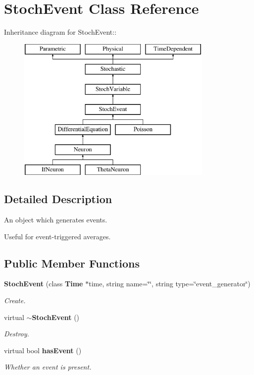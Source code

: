 \section{StochEvent Class Reference}
\label{classStochEvent}
Inheritance diagram for StochEvent::\begin{figure}[H]
\begin{center}
\leavevmode
\includegraphics[height=7cm]{classStochEvent}
\end{center}
\end{figure}


\subsection{Detailed Description}
An object which generates events. 

Useful for event-triggered averages. \subsection*{Public Member Functions}
\begin{CompactItemize}
\item 
{\bf StochEvent} (class {\bf Time} $\ast$time, string name=\char`\"{}\char`\"{}, string type=\char`\"{}event\_\-generator\char`\"{})\label{classStochEvent_99d66e994628703184df39cda702f928}

\begin{CompactList}\small\item\em Create. \item\end{CompactList}\item 
virtual {\bf $\sim$StochEvent} ()\label{classStochEvent_da007eb19a6e9b5284fde1676547b191}

\begin{CompactList}\small\item\em Destroy. \item\end{CompactList}\item 
virtual bool {\bf hasEvent} ()\label{classStochEvent_d417ae021361ede47dfc6b1d65c28a75}

\begin{CompactList}\small\item\em Whether an event is present. \item\end{CompactList}\end{CompactItemize}
